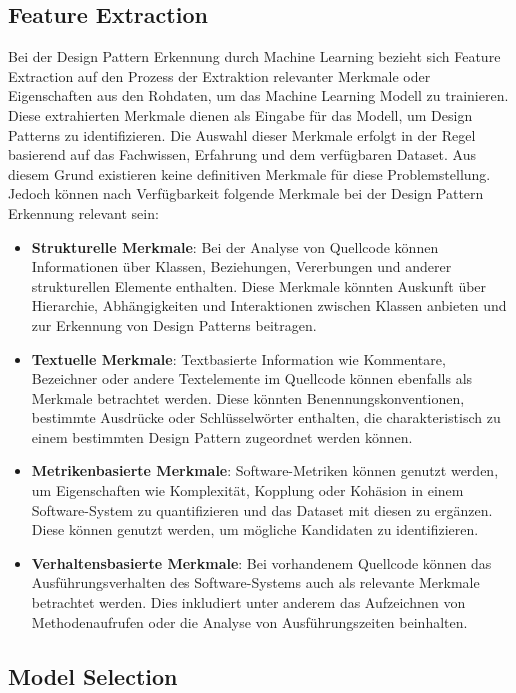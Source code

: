 \documentclass[conference]{IEEEtran}
\begin{document}
\newpage

\subsection{Feature Extraction}

Bei der Design Pattern Erkennung durch Machine Learning bezieht sich Feature Extraction auf den Prozess der Extraktion relevanter Merkmale oder Eigenschaften aus den Rohdaten, um das Machine Learning Modell zu trainieren.
Diese extrahierten Merkmale dienen als Eingabe für das Modell, um Design Patterns zu identifizieren. Die Auswahl dieser Merkmale erfolgt in der Regel basierend auf das Fachwissen, Erfahrung und dem verfügbaren Dataset.
Aus diesem Grund existieren keine definitiven Merkmale für diese Problemstellung. Jedoch können nach Verfügbarkeit folgende Merkmale bei der Design Pattern Erkennung relevant sein:

\begin{itemize}
    \item \textbf{Strukturelle Merkmale}: Bei der Analyse von Quellcode können Informationen über Klassen, Beziehungen, Vererbungen und anderer strukturellen Elemente enthalten. Diese Merkmale könnten Auskunft über Hierarchie, Abhängigkeiten und Interaktionen zwischen Klassen anbieten und zur Erkennung von Design Patterns beitragen.
    \item \textbf{Textuelle Merkmale}: Textbasierte Information wie Kommentare, Bezeichner oder andere Textelemente im Quellcode können ebenfalls als Merkmale betrachtet werden. Diese könnten Benennungskonventionen, bestimmte Ausdrücke oder Schlüsselwörter enthalten, die charakteristisch zu einem bestimmten Design Pattern zugeordnet werden können.
    \item \textbf{Metrikenbasierte Merkmale}: Software-Metriken können genutzt werden, um Eigenschaften wie Komplexität, Kopplung oder Kohäsion in einem Software-System zu quantifizieren und das Dataset mit diesen zu ergänzen. Diese können genutzt werden, um mögliche Kandidaten zu identifizieren.
    \item \textbf{Verhaltensbasierte Merkmale}: Bei vorhandenem Quellcode können das Ausführungsverhalten des Software-Systems auch als relevante Merkmale betrachtet werden. Dies inkludiert unter anderem das Aufzeichnen von Methodenaufrufen oder die Analyse von Ausführungszeiten beinhalten.
\end{itemize}


\subsection{Model Selection}
\end{document}
